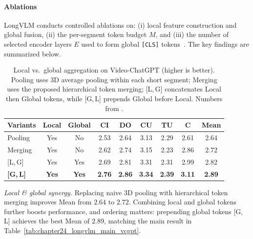 \begin{enrichment}
\begin{enrichment}
        \newpage
        
        \paragraph{Ablations}
        LongVLM conducts controlled ablations on: (i) local feature construction and global fusion, (ii) the per-segment token budget $M$, and (iii) the number of selected encoder layers $E$ used to form global \texttt{[CLS]} tokens~\cite[Sec.~4.3]{weng2024_longvlm}. The key findings are summarized below.
        
        \begin{table}[H]
            \centering
            \caption{Local vs.\ global aggregation on Video-ChatGPT (higher is better). Pooling uses 3D average pooling within each short segment; Merging uses the proposed hierarchical token merging; {[L,\,G]} concatenates Local then Global tokens, while {[G,\,L]} prepends Global before Local. Numbers from \cite[Tab.~3]{weng2024_longvlm}.}
            \label{tab:chapter24_longvlm_ablate_lg}
            \small
            \begin{tabular}{lcccccccc}
                \toprule
                \textbf{Variants} & \textbf{Local} & \textbf{Global} & \textbf{CI} & \textbf{DO} & \textbf{CU} & \textbf{TU} & \textbf{C} & \textbf{Mean} \\
                \midrule
                Pooling   & Yes & No  & 2.53 & 2.64 & 3.13 & 2.29 & 2.61 & 2.64 \\
                Merging   & Yes & No  & 2.62 & 2.74 & 3.15 & 2.23 & 2.86 & 2.72 \\
                {[L,\,G]} & Yes & Yes & 2.69 & 2.81 & 3.31 & 2.31 & 2.99 & 2.82 \\
                \textbf{[G,\,L]} & \textbf{Yes} & \textbf{Yes} & \textbf{2.76} & \textbf{2.86} & \textbf{3.34} & \textbf{2.39} & \textbf{3.11} & \textbf{2.89} \\
                \bottomrule
            \end{tabular}
        \end{table}
        
        \noindent\textit{Local \& global synergy.} Replacing naive 3D pooling with hierarchical token merging improves Mean from $2.64$ to $2.72$. Combining local and global tokens further boosts performance, and ordering matters: prepending global tokens {[G,\,L]} achieves the best Mean of $2.89$, matching the main result in Table~\ref{tab:chapter24_longvlm_main_vcgpt}.
        

\end{enrichment}
\end{enrichment}
